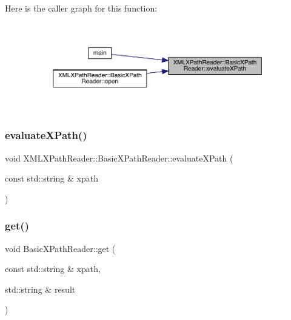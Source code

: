 Here is the caller graph for this function\+:
\nopagebreak
\begin{figure}[H]
\begin{center}
\leavevmode
\includegraphics[width=350pt]{d6/dbf/classXMLXPathReader_1_1BasicXPathReader_a0d2f7c3da72b0669541bef2e1d35f973_icgraph}
\end{center}
\end{figure}
\mbox{\label{classXMLXPathReader_1_1BasicXPathReader_a4aaa7102c9f6a8d5ca3adc574f06ce8b}} 
\subsubsection{\texorpdfstring{evaluateXPath()}{evaluateXPath()}\hspace{0.1cm}{\footnotesize\ttfamily [2/2]}}
{\footnotesize\ttfamily void X\+M\+L\+X\+Path\+Reader\+::\+Basic\+X\+Path\+Reader\+::evaluate\+X\+Path (\begin{DoxyParamCaption}\item[{const std\+::string \&}]{xpath }\end{DoxyParamCaption})}

\mbox{\label{classXMLXPathReader_1_1BasicXPathReader_a167f3e878414daf1c5804ee1de3235e9}} 
\subsubsection{\texorpdfstring{get()}{get()}\hspace{0.1cm}{\footnotesize\ttfamily [1/20]}}
{\footnotesize\ttfamily void Basic\+X\+Path\+Reader\+::get (\begin{DoxyParamCaption}\item[{const std\+::string \&}]{xpath,  }\item[{std\+::string \&}]{result }\end{DoxyParamCaption})}

